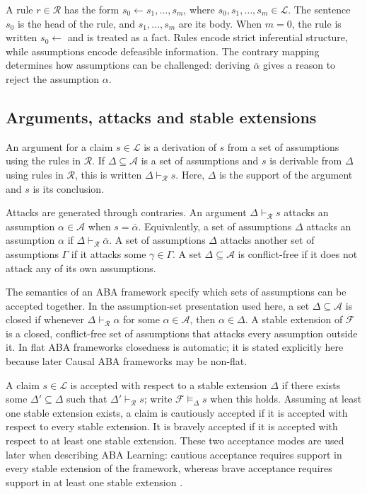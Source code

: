 A rule \(r \in \mathcal{R}\) has the form \(s_0 \leftarrow s_1,\ldots,s_m\), where \(s_0,s_1,\ldots,s_m \in \mathcal{L}\). The sentence \(s_0\) is the head of the rule, and \(s_1,\ldots,s_m\) are its body. When \(m=0\), the rule is written \(s_0 \leftarrow\) and is treated as a fact. Rules encode strict inferential structure, while assumptions encode defeasible information. The contrary mapping determines how assumptions can be challenged: deriving \(\overline{\alpha}\) gives a reason to reject the assumption \(\alpha\).

\subsection{Arguments, attacks and stable extensions}

An argument for a claim \(s \in \mathcal{L}\) is a derivation of \(s\) from a set of assumptions using the rules in \(\mathcal{R}\). If \(\Delta \subseteq \mathcal{A}\) is a set of assumptions and \(s\) is derivable from \(\Delta\) using rules in \(\mathcal{R}\), this is written \(\Delta \vdash_{\mathcal{R}} s\). Here, \(\Delta\) is the support of the argument and \(s\) is its conclusion.

Attacks are generated through contraries. An argument \(\Delta \vdash_{\mathcal{R}} s\) attacks an assumption \(\alpha \in \mathcal{A}\) when \(s = \overline{\alpha}\). Equivalently, a set of assumptions \(\Delta\) attacks an assumption \(\alpha\) if \(\Delta \vdash_{\mathcal{R}} \overline{\alpha}\). A set of assumptions \(\Delta\) attacks another set of assumptions \(\Gamma\) if it attacks some \(\gamma \in \Gamma\). A set \(\Delta \subseteq \mathcal{A}\) is conflict-free if it does not attack any of its own assumptions.

The semantics of an ABA framework specify which sets of assumptions can be accepted together. In the assumption-set presentation used here, a set \(\Delta \subseteq \mathcal{A}\) is closed if whenever \(\Delta \vdash_{\mathcal{R}} \alpha\) for some \(\alpha \in \mathcal{A}\), then \(\alpha \in \Delta\). A stable extension of \(\mathcal{F}\) is a closed, conflict-free set of assumptions that attacks every assumption outside it. In flat ABA frameworks closedness is automatic; it is stated explicitly here because later Causal ABA frameworks may be non-flat.

A claim \(s \in \mathcal{L}\) is accepted with respect to a stable extension \(\Delta\) if there exists some \(\Delta' \subseteq \Delta\) such that \(\Delta' \vdash_{\mathcal{R}} s\); write \(\mathcal{F} \models_{\Delta} s\) when this holds. Assuming at least one stable extension exists, a claim is cautiously accepted if it is accepted with respect to every stable extension. It is bravely accepted if it is accepted with respect to at least one stable extension. These two acceptance modes are used later when describing ABA Learning: cautious acceptance requires support in every stable extension of the framework, whereas brave acceptance requires support in at least one stable extension \cite{de2023aba,de2024learning}.

